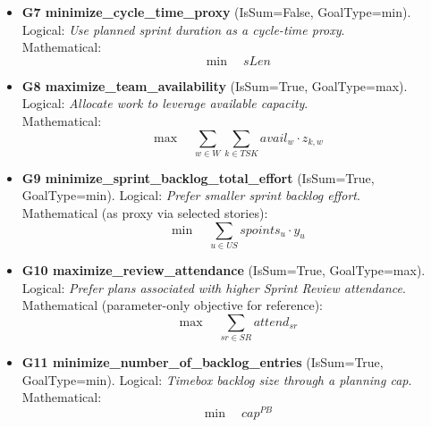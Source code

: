 \documentclass[11pt]{article}
\begin{document}
\begin{itemize}[leftmargin=2em]
  \item \textbf{G7 minimize\_cycle\_time\_proxy} (IsSum=False, GoalType=min). Logical: \emph{Use planned sprint duration as a cycle-time proxy}. \\
  Mathematical:
  \[
    \min \quad sLen
  \]

  \item \textbf{G8 maximize\_team\_availability} (IsSum=True, GoalType=max). Logical: \emph{Allocate work to leverage available capacity}. \\
  Mathematical:
  \[
    \max \quad \sum_{w\in W} \sum_{k\in TSK} avail_w \cdot z_{k,w}
  \]

  \item \textbf{G9 minimize\_sprint\_backlog\_total\_effort} (IsSum=True, GoalType=min). Logical: \emph{Prefer smaller sprint backlog effort}. \\
  Mathematical (as proxy via selected stories):
  \[
    \min \quad \sum_{u\in US} spoints_u \cdot y_u
  \]

  \item \textbf{G10 maximize\_review\_attendance} (IsSum=True, GoalType=max). Logical: \emph{Prefer plans associated with higher Sprint Review attendance}. \\
  Mathematical (parameter-only objective for reference):
  \[
    \max \quad \sum_{sr\in SR} attend_{sr}
  \]

  \item \textbf{G11 minimize\_number\_of\_backlog\_entries} (IsSum=True, GoalType=min). Logical: \emph{Timebox backlog size through a planning cap}. \\
  Mathematical:
  \[
    \min \quad cap^{PB}
  \]

\end{itemize}
\end{document}
